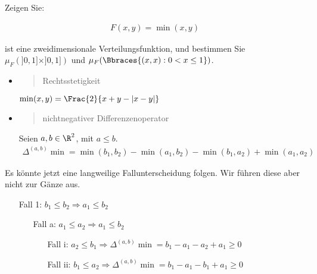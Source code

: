 
\begin{exercise}

Zeigen Sie:

\begin{align*}
  F(x, y) = \min(x, y)
\end{align*}

ist eine zweidimensionale Verteilungsfunktion, und bestimmen Sie $\mu_F(]0, 1] \times ]0, 1])$ und $\mu_F(\Bbraces{(x, x) : 0 < x \leq 1})$.

\end{exercise}


\begin{solution}

\phantom{}

\begin{itemize}

  \item \blockquote{Rechtsstetigkeit}: $\min(x, y) = \Frac{2}{x + y - |x - y|}$

  \item \blockquote{nichtnegativer Differenzenoperator}: Seien $a, b \in \R^2$, mit $a \leq b$.
  \begin{align*}
    \Delta^{(a, b)} \min
    =
    \min(b_1, b_2) - \min(a_1, b_2) - \min(b_1, a_2) + \min(a_1, a_2)
  \end{align*}

\end{itemize}

Es könnte jetzt eine langweilige Fallunterscheidung folgen. Wir führen diese aber nicht zur Gänze aus.

\begin{itemize}
  \item[Fall 1:] $b_1 \leq b_2 \Rightarrow a_1 \leq b_2$
  \begin{itemize}
    \item[Fall a:] $a_1 \leq a_2 \Rightarrow a_1 \leq b_2$
    \begin{itemize}
      \item[Fall i:] $a_2 \leq b_1 \Rightarrow
      \Delta^{(a, b)} \min = b_1 - a_1 - a_2 + a_1 \geq 0$
      \item[Fall ii:] $b_1 \leq a_2 \Rightarrow
      \Delta^{(a, b)} \min = b_1 - a_1 - b_1 + a_1 \geq 0$
    \end{itemize}
  \end{itemize}
\end{itemize}


\end{solution}
